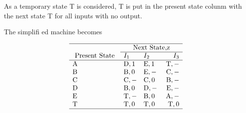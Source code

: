 \documentclass [7pt]{beamer}
\begin{document}
\begin{frame}
\justifying

As a temporary state T is considered, T is put in the present state colunm with the next state T for all inputs with no output.


The simplifi ed machine becomes 


$$\begin{array}{lllr}
\hline & \multicolumn{3}{c} {\text { Next State,z }} \\
\cline { 2 - 4 } \text { Present State } & I_{1} & I_{2} &I_{3} \\
\hline \mathrm{A} & \mathrm{D}, 1 & \mathrm{E}, 1 & \mathrm{~T},- \\
\mathrm{B} & \mathrm{B}, 0 & \mathrm{E},- & \mathrm{C},- \\
\mathrm{C} & \mathrm{C},- & \mathrm{C}, 0 & \mathrm{B},- \\
\mathrm{D} & \mathrm{B}, 0 & \mathrm{D},- & \mathrm{E},- \\
\mathrm{E} & \mathrm{T},- & \mathrm{B}, 0 & \mathrm{A},- \\
\mathrm{T} & \mathrm{T}, 0 & \mathrm{T},0 & \mathrm{T},0 \\
\hline
\end{array}$$


\end{frame}
\end{document}
